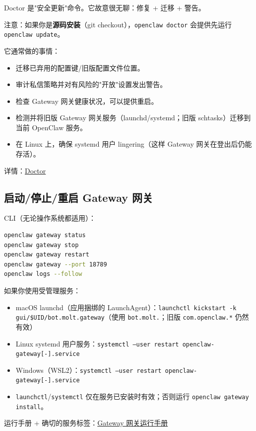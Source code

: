 Doctor 是"安全更新"命令。它故意很无聊：修复 + 迁移 + 警告。

注意：如果你是\textbf{源码安装}（git checkout），\texttt{openclaw doctor} 会提供先运行 \texttt{openclaw update}。

它通常做的事情：

\begin{itemize}
  \item 迁移已弃用的配置键/旧版配置文件位置。
  \item 审计私信策略并对有风险的"开放"设置发出警告。
  \item 检查 Gateway 网关健康状况，可以提供重启。
  \item 检测并将旧版 Gateway 网关服务（launchd/systemd；旧版 schtasks）迁移到当前 OpenClaw 服务。
  \item 在 Linux 上，确保 systemd 用户 lingering（这样 Gateway 网关在登出后仍能存活）。
\end{itemize}


详情：\href{/gateway/doctor}{Doctor}

\subsection{启动/停止/重启 Gateway 网关}


CLI（无论操作系统都适用）：

\begin{lstlisting}[language=bash]
openclaw gateway status
openclaw gateway stop
openclaw gateway restart
openclaw gateway --port 18789
openclaw logs --follow
\end{lstlisting}


如果你使用受管理服务：

\begin{itemize}
  \item macOS launchd（应用捆绑的 LaunchAgent）：\texttt{launchctl kickstart -k gui/\$UID/bot.molt.gateway}（使用 \texttt{bot.molt.}；旧版 \texttt{com.openclaw.*} 仍然有效）
  \item Linux systemd 用户服务：\texttt{systemctl --user restart openclaw-gateway[-].service}
  \item Windows（WSL2）：\texttt{systemctl --user restart openclaw-gateway[-].service}
  \item \texttt{launchctl}/\texttt{systemctl} 仅在服务已安装时有效；否则运行 \texttt{openclaw gateway install}。
\end{itemize}


运行手册 + 确切的服务标签：\href{/gateway}{Gateway 网关运行手册}

